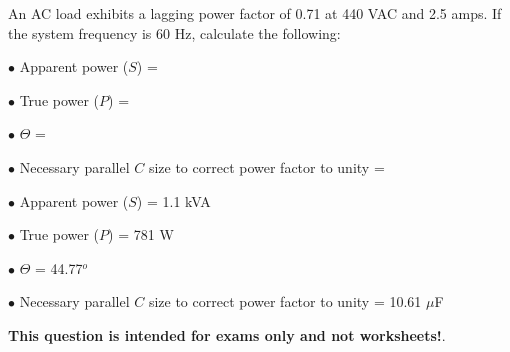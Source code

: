 

An AC load exhibits a lagging power factor of 0.71 at 440 VAC and 2.5 amps.  If the system frequency is 60 Hz, calculate the following:

\medskip
\item{$\bullet$} Apparent power ($S$) =
\item{$\bullet$} True power ($P$) =
\item{$\bullet$} $\Theta$ =
\item{$\bullet$} Necessary parallel $C$ size to correct power factor to unity = 
\medskip







\medskip
\goodbreak
\item{$\bullet$} Apparent power ($S$) = 1.1 kVA
\item{$\bullet$} True power ($P$) = 781 W
\item{$\bullet$} $\Theta$ = 44.77$^{o}$
\item{$\bullet$} Necessary parallel $C$ size to correct power factor to unity = 10.61 $\mu$F
\medskip







{\bf This question is intended for exams only and not worksheets!}.



